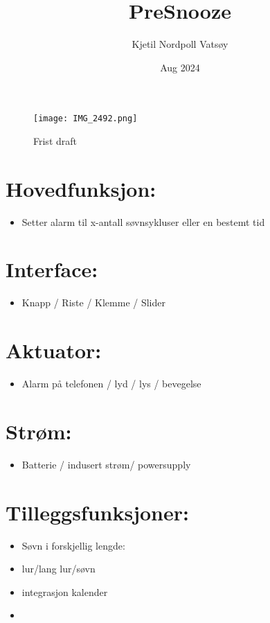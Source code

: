 \documentclass[12pt, a4paper]{article}
\begin{document}
\title{PreSnooze} 
\author{Kjetil Nordpoll Vatsøy}
\date{Aug 2024}

\maketitle
\begin{figure}[h]
\centering
\texttt{[image: IMG\_2492.png]}
\caption{Frist draft}
\end{figure}


\section {Hovedfunksjon:}
\begin{itemize}
    \item Setter alarm til x-antall søvnsykluser eller en bestemt tid
\end{itemize}


\section {Interface: }
\begin{itemize}
    \item Knapp / Riste / Klemme / Slider
\end{itemize}


\section {Aktuator:}
\begin{itemize}
    \item Alarm på telefonen / lyd / lys / bevegelse
\end{itemize}


\section {Strøm: }
\begin{itemize}
    \item Batterie / indusert strøm/ powersupply
\end{itemize}



\section {Tilleggsfunksjoner: }
\begin{itemize}
    \item Søvn i forskjellig lengde: 
    \item lur/lang lur/søvn
    \item integrasjon kalender
    \item 
\end{itemize}
\end{document}
